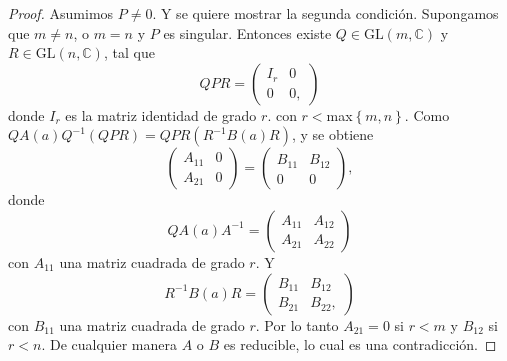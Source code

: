 \documentclass[12pt]{book}
\theoremstyle{definition}
\newcounter{in}
\begin{document}
\begin{proof}
  Asumimos $P \neq 0$. Y se quiere mostrar la segunda
  condición. Supongamos que $m \neq n$, o $m=n$ y $P$ es
  singular. Entonces existe $Q \in \mathrm{GL}(m,\mathbb{C})$ y
  $R \in \mathrm{GL}(n,\mathbb{C})$, tal que
  \begin{equation}
    \label{eq:16}
    QPR=
    \begin{pmatrix}
      I_{r} & 0 \\ 
      0 & 0,
    \end{pmatrix} 
  \end{equation}
  donde $I_{r}$ es la matriz identidad de grado $r$. con
  $r<$max$\left\{ m,n \right\}$. Como
  $QA(a)Q^{-1}(QPR) = QPR(R^{-1}B(a)R)$, y se obtiene
  \begin{equation}
    \label{eq:17}
    \begin{pmatrix}
      A_{11} & 0 \\ 
      A_{21} & 0
    \end{pmatrix}
    =
    \begin{pmatrix}
      B_{11} & B_{12} \\ 
      0 & 0
    \end{pmatrix},
  \end{equation}
  donde
  \begin{equation}
    \label{eq:18}
    QA(a)A^{-1}=
    \begin{pmatrix}
      A_{11} & A_{12} \\ 
      A_{21} & A_{22}
    \end{pmatrix} 
  \end{equation}  
  con $A_{11}$ una matriz cuadrada de grado $r$. Y
  \begin{equation}
    \label{eq:19}
    R^{-1}B(a)R=
    \begin{pmatrix}
      B_{11} & B_{12} \\ 
      B_{21} & B_{22},
    \end{pmatrix}
  \end{equation}
  con $B_{11}$ una matriz cuadrada de grado $r$. Por lo tanto
  $A_{21}=0$ si $r<m$ y $B_{12}$ si $r<n$. De cualquier manera
  $A$ o $B$ es reducible, lo cual es una
  contradicción.
\end{proof}
\end{document}
